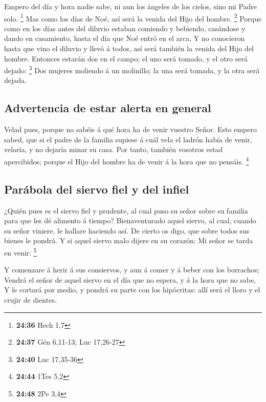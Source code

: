  Empero del día y hora nadie sabe, ni aun los ángeles de
los cielos, sino mi Padre solo. \footnote{\textbf{24:36} Hech 1,7}
 Mas como los días de Noé, así será la venida del Hijo del
hombre. \footnote{\textbf{24:37} Gén 6,11-13; Luc 17,26-27}
 Porque como en los días antes del diluvio estaban comiendo
y bebiendo, casándose y dando en casamiento, hasta el día que Noé entró
en el arca,  Y no conocieron hasta que vino el diluvio y
llevó á todos, así será también la venida del Hijo del hombre.
 Entonces estarán dos en el campo; el uno será tomado, y el
otro será dejado: \footnote{\textbf{24:40} Luc 17,35-36} 
Dos mujeres moliendo á un molinillo; la una será tomada, y la otra será
dejada.

\hypertarget{advertencia-de-estar-alerta-en-general}{%
\subsection{Advertencia de estar alerta en
general}\label{advertencia-de-estar-alerta-en-general}}

 Velad pues, porque no sabéis á qué hora ha de venir
vuestro Señor.  Esto empero sabed, que si el padre de la
familia supiese á cuál vela el ladrón había de venir, velaría, y no
dejaría minar su casa.  Por tanto, también vosotros estad
apercibidos; porque el Hijo del hombre ha de venir á la hora que no
pensáis. \footnote{\textbf{24:44} 1Tes 5,2}

\hypertarget{paruxe1bola-del-siervo-fiel-y-del-infiel}{%
\subsection{Parábola del siervo fiel y del
infiel}\label{paruxe1bola-del-siervo-fiel-y-del-infiel}}

 ¿Quién pues es el siervo fiel y prudente, al cual puso su
señor sobre su familia para que les dé alimento á tiempo? 
Bienaventurado aquel siervo, al cual, cuando su señor viniere, le
hallare haciendo así.  De cierto os digo, que sobre todos
sus bienes le pondrá.  Y si aquel siervo malo dijere en su
corazón: Mi señor se tarda en venir: \footnote{\textbf{24:48} 2Pe 3,4}

 Y comenzare á herir á sus consiervos, y aun á comer y á
beber con los borrachos;  Vendrá el señor de aquel siervo
en el día que no espera, y á la hora que no sabe,  Y le
cortará por medio, y pondrá su parte con los hipócritas: allí será el
lloro y el crujir de dientes.

